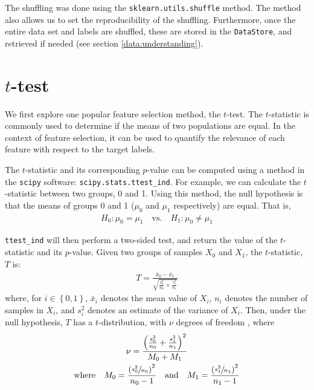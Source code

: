 \documentclass[12pt, twoside, a4paper]{report}
\begin{document}
The shuffling was done using the \texttt{sklearn.utils.shuffle} method. The method also allows us to set the reproducibility of the shuffling. Furthermore, once the entire data set and labels are shuffled, these are stored in the \texttt{DataStore}, and retrieved if needed (see section \ref{data:understanding}).


\section{$t$-test} \label{t-test}

We first explore one popular feature selection method, the $t$-test. The $t$-statistic is commonly used to determine if the means of two populations are equal. In the context of feature selection, it can be used to quantify the relevance of each feature with respect to the target labels.

The $t$-statistic and its corresponding $p$-value can be computed using a method in the \texttt{scipy} \cite{scipy} software: \texttt{scipy.stats.ttest\_ind}. For example, we can calculate the $t$-statistic between two groups, 0 and 1. Using this method, the null hypothesis is that the means of groups 0 and 1 ($\mu_0$ and $\mu_1$ respectively) are equal. That is,
\begin{align*}
H_0: \mu_0 = \mu_1 \quad \text{vs.} \quad H_1: \mu_0 \neq \mu_1
\end{align*}

\texttt{ttest\_ind} will then perform a two-sided test, and return the value of the $t$-statistic and its $p$-value. Given two groups of samples $X_0$ and $X_1$, the $t$-statistic, $T$ is:
\begin{align*}
T = \frac{\bar{x}_0 - \bar{x}_1}{\sqrt{\frac{s_0^2}{n_0} + \frac{s_1^2}{n_1}}}
\end{align*}
where, for $i \in \left\lbrace 0,1 \right\rbrace$, $\bar{x}_i$ denotes the mean value of $X_i$, $n_i$ denotes the number of samples in $X_i$, and $s_i^2$ denotes an estimate of the variance of $X_i$. Then, under the null hypothesis, $T$ has a $t$-distribution, with $\nu$ degrees of freedom \cite{RefWorks:219}, where
\begin{gather*}
\nu = \frac{\left( \frac{s_0^2}{n_0} + \frac{s_1^2}{n_1} \right)^2}{ M_0 + M_1 } \\
\text{where} \quad M_0 = \frac{\left(\sfrac{s_0^2}{n_0}\right)^2}{n_0-1} \quad \text{and} \quad
M_1 = \frac{\left(\sfrac{s_1^2}{n_1}\right)^2}{n_1-1}
\end{gather*}
\end{document}
